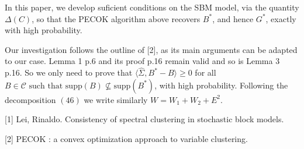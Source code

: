In this paper, we develop suficient conditions on the SBM model, via the quantity $\Delta(C)$, so that the PECOK algorithm above recovers $B^*$, and hence $G^*$, exactly with high probability.

Our investigation follows the outline of [2], as its main arguments can be adapted to our case. Lemma 1 p.6 and its proof p.16 remain valid and so is Lemma 3 p.16.
So we only need to prove that $\langle\widehat{\Sigma},B^*-B\rangle \ge 0$ for all $B \in \mathcal{C} \mbox{ such that } \mbox{supp}(B)\nsubseteq \mbox{supp}(B^*) $, with high probability.
Following the decomposition $(46)$ we write similarly $W = W_1 + W_2 + E^2$.

[1] Lei, Rinaldo. Consistency of spectral clustering in stochastic block models.

[2] PECOK : a convex optimization approach to variable clustering.
